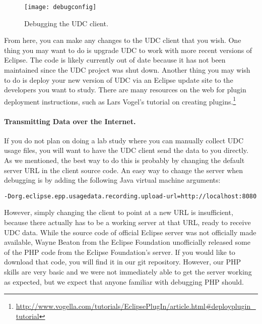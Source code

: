 \begin{figure}
  \centering
  \texttt{[image: debugconfig]}
  \caption{Debugging the UDC client.}\label{fig:debugconfig}
\end{figure}

From here, you can make any changes to the UDC client that you wish.
One thing you may want to do is upgrade UDC to work with more recent versions
of Eclipse.
The code is likely currently out of date
because it has not been maintained since the UDC project was shut down.
Another thing you may wish to do is deploy your new version of UDC via
an Eclipse update site to the developers you want to study.
There are many resources on the web for plugin deployment instructions,
such as Lars Vogel's tutorial on creating
plugins.\footnote{\url{http://www.vogella.com/tutorials/EclipsePlugIn/article.html#deployplugin_tutorial}}

\paragraph{Transmitting Data over the Internet.}

If you do not plan on doing a lab study where you can manually collect UDC usage
files, you will want to have the UDC client send the data to you directly.
As we mentioned, the best way to do this is probably by changing the default
server URL in the client source code.
An easy way to change the server when debugging is by adding the following Java
virtual machine arguments:

\vspace{4mm}
\texttt{-Dorg.eclipse.epp.usagedata.recording.upload-url=http://localhost:8080}
\vspace{4mm}

\noindent
However, simply changing the client to point at a new URL is insufficient,
because there actually has to be a working server at that URL, ready to
receive UDC data.
While the source code of official Eclipse server was not officially made
available, Wayne Beaton from the Eclipse Foundation unofficially released
some of the PHP code from the Eclipse Foundation's server.
If you would like to download that code, you will find it in our git repository.
However, our PHP skills are very basic and we were not immediately able
to get the server working as expected, but we expect that anyone familiar with
debugging PHP should.

